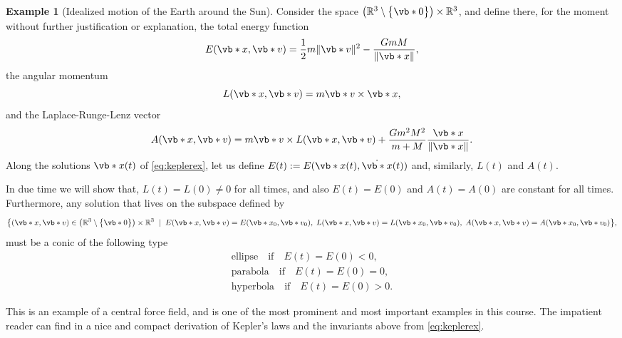 \documentclass[english,fontsize=11pt,paper=b5]{scrbook}
\theoremstyle{definition}
\newtheorem{example}{Example}[chapter]
\begin{document}
\begin{example}[Idealized motion of the Earth around the Sun]
    Consider the space $\big(\mathbb{R}^3\setminus\big\{\vb*{0}\big\}\big)\times\mathbb{R}^3$, and define there, for the moment without further justification or explanation, the total energy function
    \begin{equation}\label{eq:energyKepler}
      E(\vb*{x},\vb*{v}) = \frac{1}{2}m\|\vb*{v}\|^2 - \frac{GmM}{\|\vb*{x}\|},
    \end{equation}
    the angular momentum
    \begin{equation}
      L(\vb*{x},\vb*{v}) = m \vb*{v} \times \vb*{x},
    \end{equation}
    and the Laplace-Runge-Lenz vector
    \begin{equation}
      A(\vb*{x},\vb*{v}) = m \vb*{v} \times L(\vb*{x}, \vb*{v}) + \frac{G m^2 M^2}{m+M} \frac{\vb*{x}}{\|\vb*{x}\|}.
    \end{equation}
    Along the solutions $\vb*{x}(t)$ of \eqref{eq:keplerex}, let us define $E(t) := E(\vb*{x}(t),\dot{\vb*{x}}(t))$ and, similarly, $L(t)$ and $A(t)$.

    In due time we will show that, $L(t) = L(0) \neq 0$ for all times, and also $E(t) = E(0)$ and $A(t) = A(0)$ are constant for all times.
    Furthermore, any solution that lives on the subspace defined by
    \begin{align}
        \big\{
       (\vb*{x}, \vb*{v})\in \big(\mathbb{R}^3\setminus\big\{\vb*{0}\big\}\big)\times\mathbb{R}^3 \;\mid\;
       E(\vb*{x},\vb*{v}) = E(\vb*{x}_0, \vb*{v}_0),\;
       L(\vb*{x},\vb*{v}) = L(\vb*{x}_0, \vb*{v}_0),\;
       A(\vb*{x},\vb*{v}) = A(\vb*{x}_0, \vb*{v}_0)
     \big\},
    \end{align}
    must be a conic of the following type
    \begin{equation}
      \begin{split}
        \mbox{ellipse} \quad \mbox{if} \quad E(t) = E(0) < 0, \\
        \mbox{parabola} \quad \mbox{if} \quad E(t) = E(0) = 0, \\
        \mbox{hyperbola} \quad \mbox{if} \quad E(t) = E(0) > 0.
      \end{split}
    \end{equation}

    This is an example of a central force field, and is one of the most prominent and most important examples in this course.
    The impatient reader can find in \cite[Ch. 1]{book:knauf} a nice and compact derivation of Kepler's laws and the invariants above from \eqref{eq:keplerex}.
  \end{example}
\end{document}
